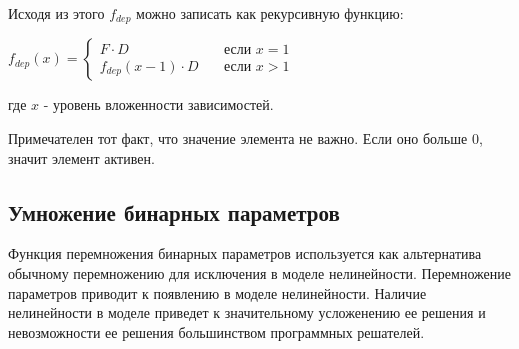Исходя из этого $f_{dep}$ можно записать как рекурсивную функцию:
\begin{center}
  $
  f_{dep}(x) = 
  \begin{cases}
    F \cdot D & \quad \text{если } x = 1 \\
    f_{dep}(x - 1) \cdot D & \quad \text{если } x > 1
  \end{cases}
  $
\end{center}
где $x$ - уровень вложенности зависимостей.

Примечателен тот факт, что значение элемента не важно. Если оно больше $0$, значит элемент активен.

\subsection*{Умножение бинарных параметров}
Функция перемножения бинарных параметров используется как альтернатива обычному перемножению для исключения в моделе нелинейности. Перемножение параметров приводит к появлению в моделе нелинейности. Наличие нелинейности в моделе приведет к значительному усложенению ее решения и невозможности ее решения большинством программных решателей.

